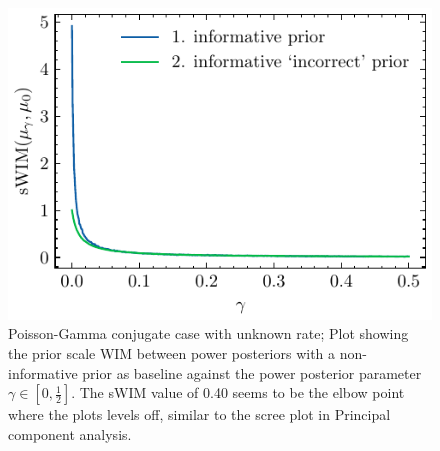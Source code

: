 \documentclass[12pt]{article}
\begin{document}
\begin{figure}[htbp]
  \centering
  \includegraphics{imgs/swim_poisson_gamma_con.pdf} 
  \caption{Poisson-Gamma conjugate case with unknown rate; Plot showing the prior scale WIM between power posteriors with a non-informative prior as baseline against the power posterior parameter $\gamma \in [0, \frac{1}{2}]$. The sWIM value of 0.40 seems to be the elbow point where the plots levels off, similar to the scree plot in Principal component analysis.} 
  \label{fig:swim_poisson_ga} 
\end{figure}
\clearpage
\end{document}
